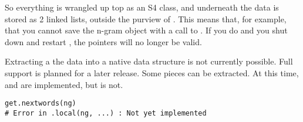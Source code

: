 So everything is wrangled up top as an S4 class, and underneath the data is 
stored as 2 linked lists, outside the purview of \R.  This means that, for 
example, that you cannot save the n-gram object with a call to .  
If you do and you shut down and restart \R, the pointers will no longer be 
valid.

Extracting a the data into a native \R data structure is not currently 
possible.  Full support is planned for a later release.  Some pieces can be 
extracted.  At this time,  and  are 
implemented, but  is not.
\begin{lstlisting}[language=rr]
get.nextwords(ng)
# Error in .local(ng, ...) : Not yet implemented
\end{lstlisting}
